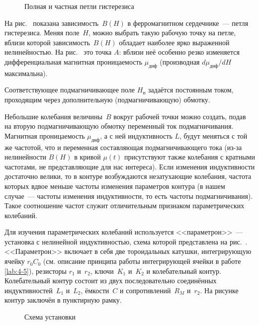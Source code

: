 \begin{figure}[h!]
    \centering
    \caption{Полная и частная петли гистерезиса}
\end{figure}

На рис.~ показана зависимость~$B(H)$ в ферромагнитном
сердечнике~--- петля гистерезиса. Меняя поле~$H$, можно выбрать такую рабочую
точку на петле, вблизи которой зависимость~$B(H)$ обладает наиболее ярко
выраженной нелинейностью. На рис.~ это точка $A$:
вблизи неё особенно резко изменяется дифференциальная магнитная
проницаемость $\mu_\text{диф}$ (производная
$d\mu_\text{диф}/dH$ максимальна).

Соответствующее подмагничивающее поле $H_\text{п}$ задаётся постоянным током,
проходящим через дополнительную (подмагничивающую) обмотку.

Небольшие колебания величины~$B$ вокруг рабочей точки можно создать, подав на
вторую подмагничивающую обмотку переменный ток подмагничивания. Магнитная
проницаемость $\mu_\text{диф}$, а с ней индуктивность $L$, будут меняться с той
же частотой, что и переменная составляющая подмагничивающего тока (из-за
нелинейности $B(H)$ в кривой $\mu(t)$ присутствуют также колебания с кратными
частотами, не представляющие для нас интереса). Если изменения индуктивности
достаточно велики, то в контуре возбуждаются незатухающие колебания, частота
которых вдвое меньше частоты изменения параметров контура (в нашем случае~---
частоты изменения индуктивности, то есть частоты подмагничивания). Такое
соотношение частот служит отличительным признаком параметрических колебаний.

\experiment
Для изучения параметрических колебаний используется <<параметрон>>~--- установка
с нелинейной индуктивностью, схема которой представлена на
рис.~. <<Параметрон>> включает в себя две
тороидальных катушки, интегрирующую ячейку $r_0C_0$ (см. описание
принципа работы интегрирующей ячейки в работе \ref{lab:4-5}),
резисторы $r_1$ и~$r_2$, ключи~$K_1$ и~$K_2$ и колебательный контур.
Колебательный контур состоит из двух последовательно соединённых
индуктивностей~$L_1$ и~$L_2$, ёмкости~$C$ и сопротивлений~$R_M$ и~$r_2$.
На рисунке контур заключён в пунктирную рамку.
\begin{figure}[h!]
\centering\small
	\caption{Схема установки}
\end{figure}

